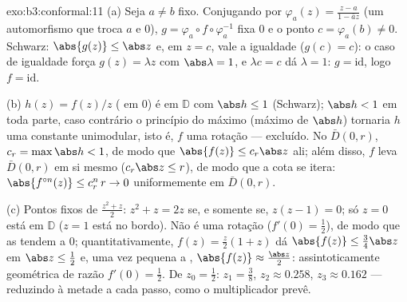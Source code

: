 \begin{solution}{exo:b3:conformal:11}
(a) Seja $a \neq b$ fixo. Conjugando por $\varphi_a(z) =
\frac{z - a}{1 - \bar az}$ (um automorfismo que troca $a$
e $0$), $g = \varphi_a\circ f\circ\varphi_a^{-1}$ fixa
$0$ e o ponto $c = \varphi_a(b) \neq 0$. Schwarz:
$\abs{g(z)} \leq \abs z$ e, em $z = c$, vale a igualdade
($g(c) = c$): o caso de igualdade força $g(z) = \lambda z$
com $\abs\lambda = 1$, e $\lambda c = c$ dá $\lambda =
1$: $g = \mathrm{id}$, logo $f = \mathrm{id}$.

(b) $h(z) = f(z)/z$ ( em $0$) é
 em $\mathbb D$ com $\abs h \leq 1$ (Schwarz);
$\abs h < 1$ em toda parte, caso contrário o princípio do máximo
(máximo  de $\abs h$) tornaria $h$ uma constante
unimodular, isto é, $f$ uma rotação --- excluído. No 
$\bar D(0,r)$, $c_r = \max\abs h < 1$, de modo que $\abs{f(z)} \leq
c_r\abs z$ ali; além disso, $f$ leva $\bar D(0,r)$ em
si mesmo ($c_r\abs z \leq r$), de modo que a cota se itera:
$\abs{f^{\circ n}(z)} \leq c_r^n\,r \to 0$ uniformemente em
$\bar D(0, r)$.

(c) Pontos fixos de $\frac{z^2 + z}2$: $z^2 + z = 2z$ se, e somente se,
$z(z - 1) = 0$; só $z = 0$ está em $\mathbb D$ ($z = 1$ está
no bordo). Não é uma rotação ($f'(0) = \frac12$), de modo que
as  tendem a $0$; quantitativamente, $f(z) = \frac z2(1 + z)$
dá $\abs{f(z)} \leq \frac{3}{4}\abs z$ em $\abs z \leq
\frac12$ e, uma vez pequena a , $\abs{f(z)} \approx
\frac{\abs z}2$: assintoticamente geométrica de razão
$f'(0) = \frac12$. De $z_0 = \frac12$: $z_1 = \frac38$,
$z_2 \approx 0.258$, $z_3 \approx 0.162$ --- reduzindo à metade a cada
passo, como o multiplicador prevê.
\end{solution}

